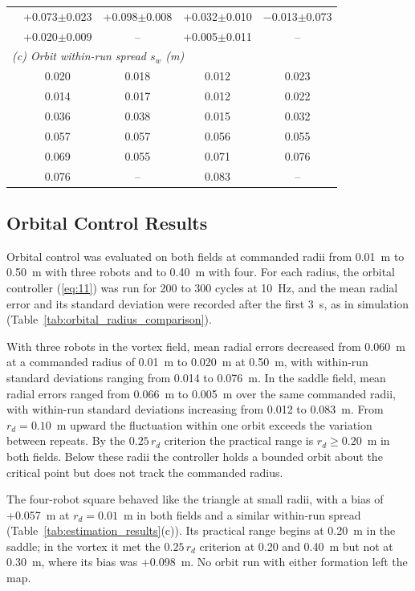 \documentclass[lettersize,journal]{IEEEtran}
\newcommand{\rev}[1]{#1}
\begin{document}
\begin{table}[!t]
{\begin{tabular}{l|cc|cc}
\quad 0.40 & +0.073$\pm$0.023 & +0.098$\pm$0.008 & +0.032$\pm$0.010 & $-$0.013$\pm$0.073 \\
\quad 0.50 & +0.020$\pm$0.009 & -- & +0.005$\pm$0.011 & -- \\
\hline
\multicolumn{5}{l}{\textit{(c) Orbit within-run spread $s_w$ (m)}} \\
\hline
\quad 0.01 & 0.020 & 0.018 & 0.012 & 0.023 \\
\quad 0.10 & 0.014 & 0.017 & 0.012 & 0.022 \\
\quad 0.20 & 0.036 & 0.038 & 0.015 & 0.032 \\
\quad 0.30 & 0.057 & 0.057 & 0.056 & 0.055 \\
\quad 0.40 & 0.069 & 0.055 & 0.071 & 0.076 \\
\quad 0.50 & 0.076 & -- & 0.083 & -- \\
\hline
\end{tabular}}
    \end{table}



\subsection{Orbital Control Results}

Orbital control was evaluated on both fields at commanded radii from 0.01~m to 0.50~m with three robots and to 0.40~m with four. For each radius, the orbital controller (\ref{eq:11}) was run for \rev{200 to 300} cycles at 10~Hz, and the mean radial error and its standard deviation were recorded after the first \rev{3}~s, as in simulation (Table~\ref{tab:orbital_radius_comparison}).

 With three robots in the vortex field, mean radial errors decreased from \rev{0.060}~m at a commanded radius of 0.01~m to \rev{0.020}~m at 0.50~m, with within-run standard deviations ranging from \rev{0.014} to \rev{0.076}~m. In the saddle field, mean radial errors ranged from \rev{0.066}~m to \rev{0.005}~m over the same commanded radii, with within-run standard deviations increasing from \rev{0.012} to \rev{0.083}~m. From $r_d = \rev{0.10}$~m upward the fluctuation within one orbit exceeds the variation between repeats. By the $0.25\,r_d$ criterion the practical range is $r_d \ge \rev{0.20}$~m in both fields. Below these radii the controller holds a bounded orbit about the critical point but does not track the commanded radius.

The four-robot square behaved like the triangle at small radii, with a bias of \rev{+0.057}~m at $r_d = 0.01$~m in both fields and a similar within-run spread (Table~\ref{tab:estimation_results}(c)). Its practical range begins at \rev{0.20}~m in the saddle; in the vortex it met the $0.25\,r_d$ criterion at 0.20 and 0.40~m but not at 0.30~m, where its bias was \rev{+0.098}~m. No orbit run with either formation left the map.
\end{document}
